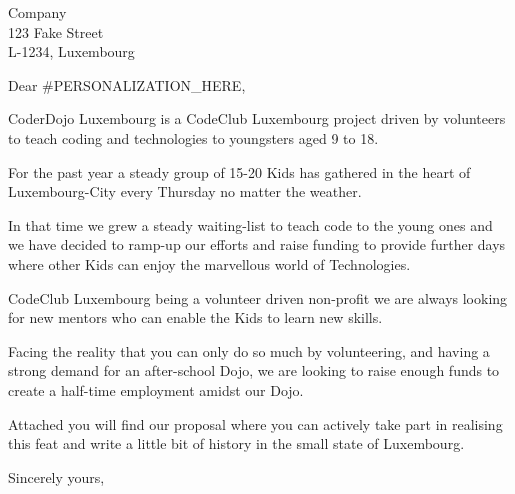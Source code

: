 \documentclass[DIN, pagenumber=false, parskip=half, fromalign=right, fromrule=false,fromlogo]{scrlttr2}
\begin{document}
 
\begin{letter}{ Company \\ 123 Fake Street \\ L-1234, Luxembourg}

\opening{Dear \#PERSONALIZATION\_HERE,}

CoderDojo Luxembourg is a CodeClub Luxembourg project driven by volunteers to teach coding and technologies to youngsters aged 9 to 18.

For the past year a steady group of 15-20 Kids has gathered in the heart of Luxembourg-City every Thursday no matter the weather.

In that time we grew a steady waiting-list to teach code to the young ones and we have decided to ramp-up our efforts and raise funding to provide further days where other Kids can enjoy the marvellous world of Technologies.

CodeClub Luxembourg being a volunteer driven non-profit we are always looking for new mentors who can enable the Kids to learn new skills.

Facing the reality that you can only do so much by volunteering, and having a strong demand for an after-school Dojo, we are looking to raise enough funds to create a half-time employment amidst our Dojo.

Attached you will find our proposal where you can actively take part in realising this feat and write a little bit of history in the small state of Luxembourg.

\closing{Sincerely yours,}

\end{letter}
\end{document}

